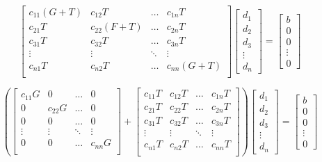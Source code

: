 \documentclass[]{article}
\begin{document}
	\begin{equation}
		\begin{bmatrix}
			c_{11}(G+T) & c_{12}T & \ldots & c_{1n}T\\
			c_{21}T & c_{22}(F+T)  & \ldots & c_{2n}T\\
			c_{31}T & c_{32}T & \ldots & c_{3n}T\\
			\vdots & \vdots  & \ddots & \vdots \\
			c_{n1}T & c_{n2}T & \ldots & c_{nn}(G+T) \\
		\end{bmatrix}
		\begin{bmatrix}
			d_1\\d_2\\d_3\\\vdots\\d_n
		\end{bmatrix}
		=
		\begin{bmatrix}
			b\\0\\0\\\vdots\\0
		\end{bmatrix}
	\end{equation}

	\begin{equation}
		\left(\begin{bmatrix}
			c_{11}G & 0 & \ldots & 0\\
			0 & c_{22}G  & \ldots & 0\\
			0 & 0& \ldots & 0\\
			\vdots & \vdots  & \ddots & \vdots \\
			0 & 0 & \ldots & c_{nn}G \\
		\end{bmatrix}+
		\begin{bmatrix}
			c_{11}T & c_{12}T & \ldots & c_{1n}T\\
			c_{21}T & c_{22}T  & \ldots & c_{2n}T\\
			c_{31}T & c_{32}T & \ldots & c_{3n}T\\
			\vdots & \vdots  & \ddots & \vdots \\
			c_{n1}T & c_{n2}T & \ldots & c_{nn}T \\
		\end{bmatrix}\right)
		\begin{bmatrix}
			d_1\\d_2\\d_3\\\vdots\\d_n
		\end{bmatrix}
		=
		\begin{bmatrix}
			b\\0\\0\\\vdots\\0
		\end{bmatrix}
	\end{equation}
	
\end{document}
